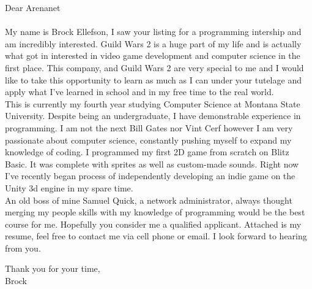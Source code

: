 \documentclass[a4paper,12pt]{letter}
\author{Brock Ellefson} %
\begin{document}
Dear Arenanet\\\\
My name is Brock Ellefson, I saw your listing for a programming intership and am incredibly interested. Guild Wars 2 is a huge part of my life and is actually what got in interested in video game development and computer science in the first place. This company, and Guild Wars 2 are very special to me and I would like to take this opportunity to learn as much as I can under your tutelage and apply what I've learned in school and in my free time to the real world.  \\ 


This is currently my fourth year studying Computer Science at Montana State University. Despite being an undergraduate, I have demonstrable  experience in programming. I am not the next Bill Gates nor Vint Cerf however I am very passionate about computer science, constantly pushing myself to expand my knowledge of coding. I programmed my first 2D game from scratch on Blitz Basic. It was complete with sprites as well as custom-made sounds. Right now I've recently began process of independently developing an indie game on the Unity 3d engine in my spare time.\\   


An old boss of mine Samuel Quick, a network administrator, always thought merging my people skills with my knowledge of programming would be the best course for me. Hopefully you consider me a qualified applicant. Attached is my resume, feel free to contact me via cell phone or email. I look forward to hearing from you.


Thank you for your time, \\
Brock
\end{document}
